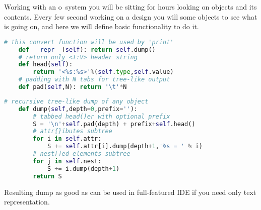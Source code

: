 
Working with an o\F\ system you will be sitting for hours looking on objects and
its contents. Every few second working on a design you will  some
objects to see what is going on, and here we will define basic functionality to
do it.

\begin{lstlisting}[language=Python]
	# this convert function will be used by 'print'
	def __repr__(self): return self.dump()
	# return only <T:V> header string
	def head(self):
		return '<%s:%s>'%(self.type,self.value)
	# padding with N tabs for tree-like output
	def pad(self,N): return '\t'*N
\end{lstlisting}
\clearpage
\begin{lstlisting}[language=Python]
	# recursive tree-like dump of any object
	def dump(self,depth=0,prefix=''):
		# tabbed head()er with optional prefix
		S = '\n'+self.pad(depth) + prefix+self.head()
		# attr{}ibutes subtree
		for i in self.attr:
			S += self.attr[i].dump(depth+1,'%s = ' % i)
		# nest[]ed elements subtree
		for j in self.nest:
			S += i.dump(depth+1)
		return S
\end{lstlisting}
\noindent
Resulting dump as good as can be used in full-featured IDE if you need only text
representation.
